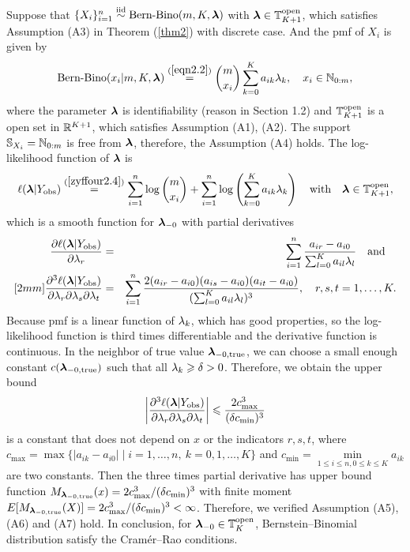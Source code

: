 Suppose that $\{X_i\}_{i=1}^n \stackrel{{\rm iid}}{\sim} \mbox{Bern-Bino}(m, K, {\boldsymbol{\lambda}})$ with ${\boldsymbol{\lambda}} \in {\mathbb{T}}_{K+1}^{\rm open}$, which satisfies Assumption (A3) in Theorem (\ref{thm2}) with discrete case. And the pmf of $X_i$ is given by
\begin{eqnarray*}
   \mbox{Bern-Bino}(x_i|m, K, {\boldsymbol{\lambda}}) \stackrel{(\ref{eqn2.2})}{=} \binom{m}{x_i} \sum_{k=0}^K a_{ik} \lambda_k, \quad x_i \in {\mathbb{N}}_{0:m},
\end{eqnarray*}
where the parameter ${\boldsymbol{\lambda}}$ is identifiability (reason in Section 1.2) and ${\mathbb{T}}_{K+1}^{\rm open}$ is a open set in ${\mathbb{R}}^{K+1}$, which satisfies Assumption (A1), (A2). The support ${\mathbb{S}}_{X_i}= {\mathbb{N}}_{0:m}$ is free from ${\boldsymbol{\lambda}}$, therefore, the Assumption (A4) holds. The log-likelihood function of ${\boldsymbol{\lambda}}$ is
\begin{eqnarray*}
   \ell({\boldsymbol{\lambda}}|Y_{\rm obs}) \stackrel{(\ref{zyffour2.4})}{=} \sum_{i=1}^n \log\binom{m}{x_i} + \sum_{i=1}^n \log \left(\sum_{k=0}^K a_{ik}\lambda_k \right) \quad \mbox{with} \quad  {\boldsymbol{\lambda}} \in {\mathbb{T}}_{K+1}^{\rm open},
\end{eqnarray*}
which is a smooth function for ${\boldsymbol{\lambda}}_{-0}$ with partial derivatives
\begin{eqnarray}
    \frac{\partial\ell({\boldsymbol{\lambda}}|Y_{\rm obs})}{\partial\lambda_r} &=& \sum_{i=1}^n \frac{a_{ir} - a_{i0}}{\sum_{l=0}^K a_{il}\lambda_l} \quad \mbox{and} \quad \nonumber \\ [2mm]
    \frac{\partial^3\ell({\boldsymbol{\lambda}}|Y_{\rm obs})}{\partial\lambda_r\partial\lambda_s\partial\lambda_t} &=& \sum_{i=1}^n \frac{2(a_{ir}-a_{i0})(a_{is}-a_{i0})(a_{it}-a_{i0})}{(\sum_{l=0}^K a_{il}\lambda_l)^3},\quad r,s,t = 1, \ldots, K. \nonumber
\end{eqnarray}
Because pmf is a linear function of $\lambda_k$, which has good properties, so the log-likelihood function is third times differentiable and the derivative function is continuous. In the neighbor of true value ${\boldsymbol{\lambda}}_{-0,\rm true}$, we can choose a small enough constant $c({\boldsymbol{\lambda}}_{-0,\rm true})$ such that all $\lambda_k \geqslant \delta > 0$. Therefore, we obtain the upper bound
\begin{eqnarray}
    \bigg|\frac{\partial^3\ell({\boldsymbol{\lambda}}|Y_{\rm obs})}{\partial\lambda_r\partial\lambda_s\partial\lambda_t}\bigg| \leqslant \frac{2c_{\max}^3}{(\delta c_{\min})^3} \nonumber
\end{eqnarray}
is a constant that does not depend on $x$ or the indicators $r,s,t$, where $c_{\max} = \max\{|a_{ik} - a_{i0}| \; \big| \; i=1,\ldots,n, \ k = 0,1,\ldots,K\}$ and $c_{\min} = \min\limits_{1 \le i \le n, 0\le k\le K} a_{ik}$ are two constants. Then the three times partial derivative has upper bound function $M_{{\boldsymbol{\lambda}}_{-0,\rm true}}(x) = 2c_{\max}^3/(\delta c_{\min})^3$ with finite moment $E[M_{{\boldsymbol{\lambda}}_{-0,\rm true}}(X)] = 2c_{\max}^3/(\delta c_{\min})^3 < \infty$. Therefore, we verified Assumption (A5), (A6) and (A7) hold. In conclusion, for ${\boldsymbol{\lambda}}_{-0} \in {\mathbb{T}}_{K}^{\rm open}$, Bernstein–Binomial distribution satisfy the Cram\'er–Rao conditions.